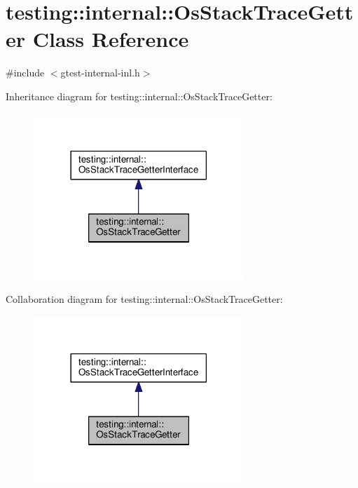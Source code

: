 \hypertarget{classtesting_1_1internal_1_1OsStackTraceGetter}{}\section{testing\+:\+:internal\+:\+:Os\+Stack\+Trace\+Getter Class Reference}
\label{classtesting_1_1internal_1_1OsStackTraceGetter}


{\ttfamily \#include $<$gtest-\/internal-\/inl.\+h$>$}



Inheritance diagram for testing\+:\+:internal\+:\+:Os\+Stack\+Trace\+Getter\+:
\nopagebreak
\begin{figure}[H]
\begin{center}
\leavevmode
\includegraphics[width=225pt]{classtesting_1_1internal_1_1OsStackTraceGetter__inherit__graph}
\end{center}
\end{figure}


Collaboration diagram for testing\+:\+:internal\+:\+:Os\+Stack\+Trace\+Getter\+:
\nopagebreak
\begin{figure}[H]
\begin{center}
\leavevmode
\includegraphics[width=225pt]{classtesting_1_1internal_1_1OsStackTraceGetter__coll__graph}
\end{center}
\end{figure}
